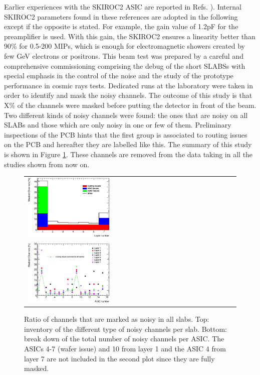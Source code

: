 \documentclass[final,3p,times,twocolumn]{elsarticle}
\begin{document}
Earlier experiences with the SKIROC2 ASIC are reported in Refs. \cite{Amjad:2014tha,Suehara:2018mqk}). 
Internal SKIROC2 parameters found in these references are adopted in the following
except if the opposite is stated.
For example, the gain value of 1.2pF for the preamplifier is used. 
With this gain, the SKIROC2 ensures a linearity better than 90\% 
for 0.5-200 MIPs, which is enough for 
electromagnetic showers created by few GeV 
electrons or positrons.
This beam test was prepared by a careful and comprehensive commissioning comprising
the debug of the
short SLABSs with special emphasis in the control of the noise and the study of the
prototype performance in cosmic rays tests. Dedicated runs at the laboratory were taken
in order to identify and mask the noisy channels. The outcome of this study
is that X\% of the channels were masked before putting the detector in front of the beam.
Two different kinds of noisy channels were found: the ones that are noisy on all
SLABs and those which are only noisy in one or few of them. Preliminary inspections
of the PCB hints that the first group is associated to routing issues on the PCB and
hereafter they are labelled like this. The summary of this study is shown in Figure \ref{noisycells}.
These channels are removed from the data taking in all the studies shown from now on.

\begin{figure}[!t]
  \centering
  \begin{tabular}{l}
  \includegraphics[width=0.4\textwidth]{../figs/commissioning/masked_layer.eps} \\
  \includegraphics[width=0.4\textwidth]{../figs/commissioning/masked_chip.eps}
  \end{tabular}
\caption{Ratio of channels that are marked as noisy in all slabs. 
Top: inventory of the different type of noisy channels per slab. 
Bottom: break down of the total number of noisy channels per ASIC. 
The ASICs 4-7 (wafer issue) and 10 from layer 1 and the ASIC 4 from layer 7 are not included
in the second plot since they are fully masked.}
\label{noisycells}
\end{figure}
\end{document}
